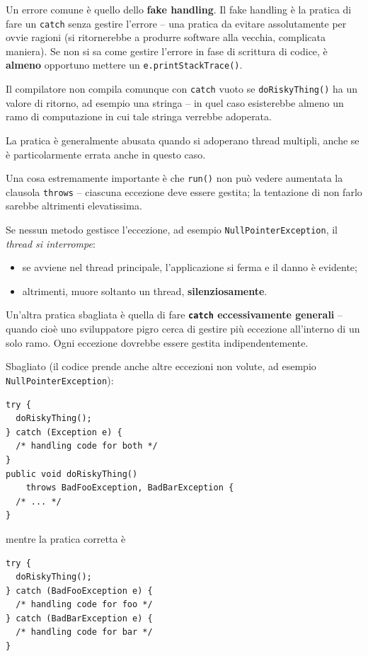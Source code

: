 \documentclass[\fontsizeclass,twocolumn]{\classname}
\theoremstyle{definition}
\theoremstyle{definition}
\begin{document}
Un errore comune è quello dello \textbf{fake handling}. Il fake handling è la
pratica di fare un \texttt{catch} senza gestire l'errore -- una pratica da
evitare assolutamente per ovvie ragioni (si ritornerebbe a produrre software
alla vecchia, complicata maniera). Se non si sa come gestire l'errore in fase
di scrittura di codice, è \textbf{almeno} opportuno mettere un
\texttt{e.printStackTrace()}.

Il compilatore non compila comunque con \texttt{catch} vuoto se
\texttt{doRiskyThing()} ha un valore di ritorno, ad esempio una stringa -- in
quel caso esisterebbe almeno un ramo di computazione in cui tale stringa
verrebbe adoperata.

La pratica è generalmente abusata quando si adoperano thread multipli, anche se
è particolarmente errata anche in questo caso.

Una cosa estremamente importante è che \texttt{run()} non può vedere aumentata
la clausola \texttt{throws} -- ciascuna eccezione deve essere gestita; la
tentazione di non farlo sarebbe altrimenti elevatissima.

Se nessun metodo gestisce l'eccezione, ad esempio
\texttt{NullPointer\-Exception}, il \emph{thread si interrompe}:
\begin{itemize}
    \item se avviene nel thread principale, l'applicazione si ferma e il danno
        è evidente;
    \item altrimenti, muore soltanto un thread, \textbf{silenziosamente}.
\end{itemize}

Un'altra pratica sbagliata è quella di fare \textbf{\texttt{catch}
eccessivamente generali} -- quando cioè uno sviluppatore pigro cerca di gestire
più eccezione all'interno di un solo ramo. Ogni eccezione dovrebbe essere
gestita indipendentemente.

Sbagliato (il codice prende anche altre eccezioni non volute, ad esempio
\texttt{NullPointer\-Exception}):

\begin{lstlisting}
try {
  doRiskyThing();
} catch (Exception e) {
  /* handling code for both */
}
public void doRiskyThing()
    throws BadFooException, BadBarException {
  /* ... */
}
\end{lstlisting}

mentre la pratica corretta è

\begin{lstlisting}
try {
  doRiskyThing();
} catch (BadFooException e) {
  /* handling code for foo */
} catch (BadBarException e) {
  /* handling code for bar */
}
\end{lstlisting}
\end{document}
